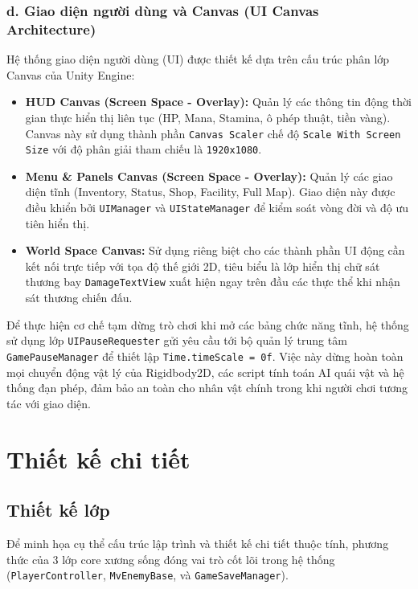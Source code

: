 \documentclass[../DoAn.tex]{subfiles}
\begin{document}
\subsubsection{d. Giao diện người dùng và Canvas (UI Canvas Architecture)}
Hệ thống giao diện người dùng (UI) được thiết kế dựa trên cấu trúc phân lớp Canvas của Unity Engine:
\begin{itemize}
    \item \textbf{HUD Canvas (Screen Space - Overlay):} Quản lý các thông tin động thời gian thực hiển thị liên tục (HP, Mana, Stamina, ô phép thuật, tiền vàng). Canvas này sử dụng thành phần \texttt{Canvas Scaler} chế độ \texttt{Scale With Screen Size} với độ phân giải tham chiếu là \texttt{1920x1080}.
    \item \textbf{Menu \& Panels Canvas (Screen Space - Overlay):} Quản lý các giao diện tĩnh (Inventory, Status, Shop, Facility, Full Map). Giao diện này được điều khiển bởi \texttt{UIManager} và \texttt{UIStateManager} để kiểm soát vòng đời và độ ưu tiên hiển thị.
    \item \textbf{World Space Canvas:} Sử dụng riêng biệt cho các thành phần UI động cần kết nối trực tiếp với tọa độ thế giới 2D, tiêu biểu là lớp hiển thị chữ sát thương bay \texttt{DamageTextView} xuất hiện ngay trên đầu các thực thể khi nhận sát thương chiến đấu.
\end{itemize}

Để thực hiện cơ chế tạm dừng trò chơi khi mở các bảng chức năng tĩnh, hệ thống sử dụng lớp \texttt{UIPauseRequester} gửi yêu cầu tới bộ quản lý trung tâm \texttt{GamePauseManager} để thiết lập \texttt{Time.timeScale = 0f}. Việc này dừng hoàn toàn mọi chuyển động vật lý của Rigidbody2D, các script tính toán AI quái vật và hệ thống đạn phép, đảm bảo an toàn cho nhân vật chính trong khi người chơi tương tác với giao diện.


\section{Thiết kế chi tiết}
\label{section:5.3}

\subsection{Thiết kế lớp}
\label{subsection:5.3.1}
Để minh họa cụ thể cấu trúc lập trình và thiết kế chi tiết thuộc tính, phương thức của 3 lớp core xương sống đóng vai trò cốt lõi trong hệ thống (\texttt{PlayerController}, \texttt{MvEnemyBase}, và \texttt{GameSaveManager}).
\end{document}
